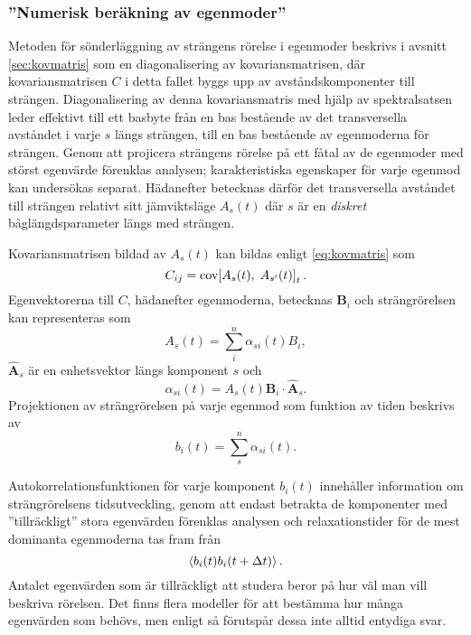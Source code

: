 \subsubsection{''Numerisk beräkning av egenmoder''}

Metoden för sönderläggning av strängens rörelse i egenmoder beskrivs i avsnitt \ref{sec:kovmatris} som en diagonalisering av kovariansmatrisen, där kovariansmatrisen $C$ i detta fallet byggs upp av avståndskomponenter till strängen. %
Diagonalisering av denna kovariansmatris med hjälp av spektralsatsen leder effektivt till ett basbyte från en bas bestående av det transversella avståndet i varje $s$ längs strängen, till en bas bestående av egenmoderna för strängen. %
Genom att projicera strängens rörelse på ett fåtal av de egenmoder med störst egenvärde förenklas analysen\cite{Shlens_PCA2014}; karakteristiska egenskaper för varje egenmod kan undersökas separat. Hädanefter betecknas därför det transversella avståndet till strängen relativt sitt jämviktsläge $A_s(t)$ där $s$ är en \emph{diskret} båglängdsparameter längs med strängen.

Kovariansmatrisen bildad av $A_s(t)$ kan bildas enligt \eqref{eq:kovmatris} som 
\begin{equation}
\label{eq:C}
    C_{ij} = \text{cov}\!\left[A_s(t),\;A_{s'}(t)\right]_t.
\end{equation}
Egenvektorerna till $C$, hädanefter egenmoderna, betecknas $\mathbf{B}_i$ och strängrörelsen kan representeras som
\begin{equation}
    A_s(t) = \sum_i^n \alpha_{si}(t)B_i,
\end{equation}
$\hat{\mathbf{A}}_s$ är en enhetsvektor längs komponent $s$ och 
\begin{equation}
    \alpha_{si}(t) = A_s(t)\mathbf{B}_i\cdot\hat{\mathbf{A}}_s.
\end{equation}
Projektionen av strängrörelsen på varje egenmod som funktion av tiden beskrivs av
\begin{equation}
    b_i(t) = \sum_s^n \alpha_{si}(t).
\end{equation}

Autokorrelationsfunktionen för varje komponent $b_i(t)$ innehåller information om strängrörelsens tidsutveckling, genom att endast betrakta de komponenter med ''tillräckligt'' stora egenvärden förenklas analysen och relaxationstider för de mest dominanta egenmoderna tas fram från 
\begin{equation}
    \ev{b_i(t)b_i(t+\Delta t)}.
\end{equation}
Antalet egenvärden som är tillräckligt att studera beror på hur väl man vill beskriva rörelsen. Det finns flera modeller för att bestämma hur många egenvärden som behövs, men enligt \cite{Cangelosi2007} så förutspår dessa inte alltid entydiga svar. 


